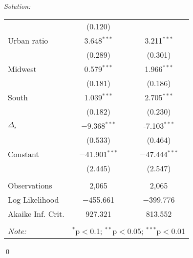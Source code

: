 \documentclass[12pt]{article}
\newenvironment{sol}
    {\emph{Solution:}
    }
    {
    \qed
    }
\begin{document}
\begin{sol}
\begin{table}[!htbp]
\begin{tabular}{@{\extracolsep{5pt}}lcc}
    & (0.120) &  \\ 
   Urban ratio & 3.648$^{***}$ & 3.211$^{***}$ \\ 
    & (0.289) & (0.301) \\ 
   Midwest& 0.579$^{***}$ & 1.966$^{***}$ \\ 
    & (0.181) & (0.186) \\ 
   South & 1.039$^{***}$ & 2.705$^{***}$ \\ 
    & (0.182) & (0.230) \\ 
   $\Delta_i$& $-$9.368$^{***}$ & -7.103$^{***}$ \\ 
    & (0.533) &  (0.464)\\ 
   Constant & $-$41.901$^{***}$ & $-$47.444$^{***}$ \\ 
    & (2.445) & (2.547) \\ 
  \hline \\[-1.8ex] 
  Observations & 2,065 & 2,065 \\ 
  Log Likelihood & $-$455.661 & $-$399.776 \\ 
  Akaike Inf. Crit. & 927.321 & 813.552 \\ 
  \hline 
  \hline \\[-1.8ex] 
  \textit{Note:}  & \multicolumn{2}{r}{$^{*}$p$<$0.1; $^{**}$p$<$0.05; $^{***}$p$<$0.01} \\ 
  \end{tabular} 
  \end{table} 

\end{sol}
\end{document}
